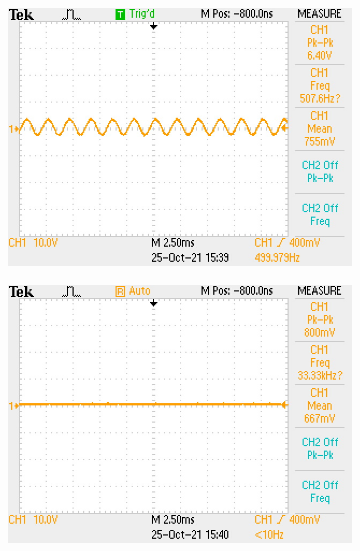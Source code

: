 \documentclass[a4paper,11pt]{article}
\begin{document}
\begin{figure}[h!]
\begin{subfigure}{0.45\textwidth}
        \includegraphics[width=\columnwidth]{power_output/filter_output_500Hz.JPG}
        \subcaption{}
    \end{subfigure}
    \begin{subfigure}{0.45\textwidth}
        \includegraphics[width=\columnwidth]{power_output/filter_output_2kHz.JPG}
        \subcaption{}
    \end{subfigure}
    \caption{}
\end{figure}
\end{document}
